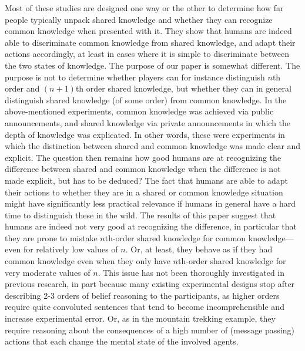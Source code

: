 \documentclass[twocolumn,a4paper,superscriptaddress,nofootinbib]{revtex4}
\newcommand{\tsn}[1]{{\color{blue} TSN: #1}}
\begin{document}
Most of these studies are designed one way or the other to determine how far people typically unpack shared knowledge and whether they can recognize common knowledge when presented with it. They show that humans are indeed able to discriminate common knowledge from shared knowledge, and adapt their actions accordingly, at least in cases where it is simple to discriminate between the two states of knowledge. The purpose of our paper is somewhat different. The purpose is not to determine whether players can for instance distinguish $n$th order and $(n+1)$th order shared knowledge, but whether they can in general distinguish shared knowledge (of some order) from common knowledge. In the above-mentioned experiments, common knowledge was achieved via public announcements, and shared knowledge via private announcements in which the depth of knowledge was explicated. In other words, these were experiments in which the distinction between shared and common knowledge was made clear and explicit. The question then remains how good humans are at recognizing the difference between shared and common knowledge when the difference is not made explicit, but has to be deduced? The fact that humans are able to adapt their actions to whether they are in a shared or common knowledge situation might have significantly less practical relevance if humans in general have a hard time to distinguish these in the wild. The results of this paper suggest that humans are indeed not very good at recognizing the difference, in particular that they are prone to mistake $n$th-order shared knowledge for common knowledge---even for relatively low values of $n$. Or, at least, they behave as if they had common knowledge even when they only have $n$th-order shared knowledge for very moderate values of $n$. %
This issue has not been thoroughly investigated in previous research, in part because many existing experimental designs stop after describing 2-3 orders of belief reasoning to the participants, as higher orders require quite convoluted sentences that tend to become incomprehensible and increase experimental error. Or, as in the mountain trekking example, they require reasoning about the consequences of a high number of (message passing) actions that each change the mental state of the involved agents.
\end{document}
